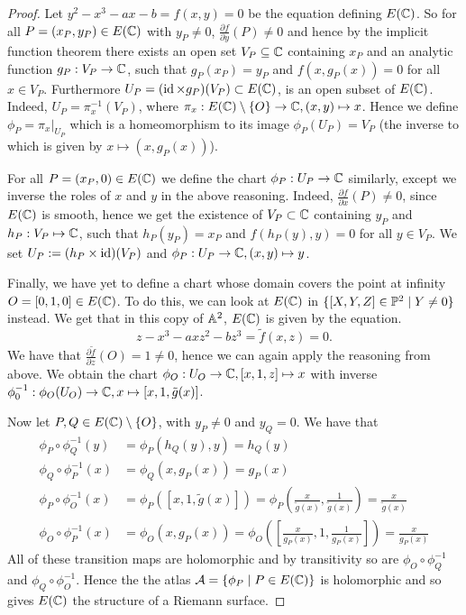\begin{proof}
	Let $y^2 - x^3 - ax - b = f(x, y) = 0$ be the equation defining $E(\mathbb{C})$.
	So for all $P = (x_P, y_P) \in E(\mathbb{C})$ with $y_P \neq 0$,
	$\frac{\partial f}{\partial y}(P) \neq 0$ and hence by the implicit function
	theorem there exists an open set $V_P \subseteq \mathbb{C}$ containing $x_P$ and an
	analytic function $g_P: V_P \to \mathbb{C}$, such that $g_P(x_P) = y_P$ and
	$f(x, g_P(x)) = 0$ for all $x \in V_P$. 
	Furthermore $U_P = (\operatorname{id}\times g_P)(V_P) \subset E(\mathbb{C})$,
	is an open subset of $E(\mathbb{C})$. Indeed, $U_P = \pi_x^{-1}(V_P)$, where
	$\pi_x: E(\mathbb{C})\setminus\{O\} \to \mathbb{C}, (x, y) \mapsto x$.
	Hence we define
	$\phi_P = \pi_x\vert_{U_P}$ which is a homeomorphism to its
	image $\phi_P(U_P) = V_P$ (the inverse to which is given by
	$x \mapsto (x, g_P(x))$).

	For all $P = (x_P, 0) \in E(\mathbb{C})$ we define the chart $\phi_P: U_P \to \mathbb{C}$
	similarly, except we inverse the roles of $x$ and $y$ in the above reasoning.
	Indeed, $\frac{\partial f}{\partial x}(P) \neq 0$, since $E(\mathbb{C})$ is smooth,
	hence we get the existence of $V_P \subset \mathbb{C}$ containing $y_P$ and
	$h_P: V_P \mapsto \mathbb{C}$, such that $h_P(y_P) = x_P$ and
	$f(h_P(y), y) = 0$ for all $y \in V_P$. We set
	$U_P := (h_P \times \operatorname{id})(V_P)$ and 
	$\phi_P: U_P \to \mathbb{C}, (x, y) \mapsto y$.

	Finally, we have yet to define a chart whose domain covers the point at
	infinity $O = [0, 1, 0] \in E(\mathbb{C})$. To do this, we can look at $E(\mathbb{C})$
	in $\{[X, Y, Z] \in \mathbb{P}^2 \mid Y \neq 0\}$ instead.
	We get that in this copy of $\mathbb{A}^2$, $E(\mathbb{C})$ is given by
	the equation. 
	\begin{equation*}
		z - x^3 - axz^2 - bz^3 = \tilde f(x, z) = 0.
	\end{equation*}
	We have that $\frac{\partial \tilde f}{\partial z} (O) = 1 \neq 0$, hence we
	can again apply the reasoning from above. We obtain the chart
	$\phi_O: U_O \to \mathbb{C}, [x, 1, z] \mapsto x$ with inverse
	$\phi_0^{-1}: \phi_O(U_O) \to \mathbb{C}, x \mapsto [x, 1, \tilde g(x)]$.

	Now let $P, Q \in E(\mathbb{C}) \setminus \{O\}$, with $y_P \neq 0$ and $y_Q = 0$.
	We have that
	\begin{align*}
		\phi_P \circ \phi_Q^{-1} (y) &= \phi_P(h_Q(y), y) = h_Q(y)\\
		\phi_Q \circ \phi_P^{-1} (x) &= \phi_{Q}(x, g_P(x)) = g_P(x)\\
		\phi_P\circ \phi_O^{-1}(x) &= \phi_P([x, 1, \tilde g(x)])
		= \phi_P\left(\frac{x}{\tilde g(x)},
		\frac{1}{\tilde g(x)}\right) = \frac{x}{\tilde g(x)}\\
		\phi_O\circ \phi_P^{-1}(x) &= \phi_O(x, g_P(x))
		= \phi_O\left(\left[\frac{x}{g_P(x)}, 1, \frac{1}{g_P(x)}\right]\right)
		= \frac{x}{g_P(x)}
	\end{align*}
	All of these transition maps are holomorphic and by transitivity so are
	$\phi_O \circ \phi_Q^{-1}$ and $\phi_Q \circ \phi_O^{-1}$.
	Hence the the atlas $\mathcal{A} = \{\phi_P \mid P \in E(\mathbb{C})\}$ is
	holomorphic
	and so gives $E(\mathbb{C})$ the structure of a Riemann surface.
\end{proof}

